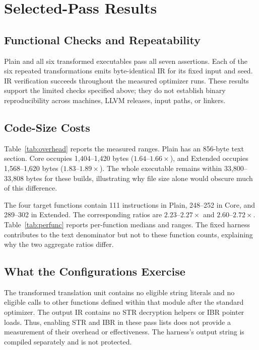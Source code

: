 \documentclass[conference]{IEEEtran}
\begin{document}
\section{Selected-Pass Results}
\label{sec:results}



\subsection{Functional Checks and Repeatability}

Plain and all six transformed executables pass all seven assertions.
Each of the six repeated transformations emits byte-identical IR for
its fixed input and seed. IR verification succeeds throughout the
measured optimizer runs. These results support the limited checks
specified above; they do not establish binary reproducibility across
machines, LLVM releases, input paths, or linkers.

\subsection{Code-Size Costs}

Table~\ref{tab:overhead} reports the measured ranges. Plain has an
856-byte text section. Core occupies 1,404--1,420 bytes
($1.64$--$1.66\times$), and Extended occupies 1,568--1,620 bytes
($1.83$--$1.89\times$). The whole executable remains within
33,800--33,808 bytes for these builds, illustrating why file size alone
would obscure much of this difference.

The four target functions contain 111 instructions in Plain,
248--252 in Core, and 289--302 in Extended. The corresponding ratios
are $2.23$--$2.27\times$ and $2.60$--$2.72\times$.
Table~\ref{tab:perfunc} reports per-function medians and ranges.
The fixed harness contributes to the text denominator but not to these
function counts, explaining why the two aggregate ratios differ.

\subsection{What the Configurations Exercise}

The transformed translation unit contains no eligible string literals
and no eligible calls to other functions defined within that module
after the standard optimizer. The output IR contains no STR decryption
helpers or IBR pointer loads. Thus, enabling STR and IBR in these pass
lists does not provide a measurement of their overhead or effectiveness.
The harness's output string is compiled separately and is not protected.
\end{document}
